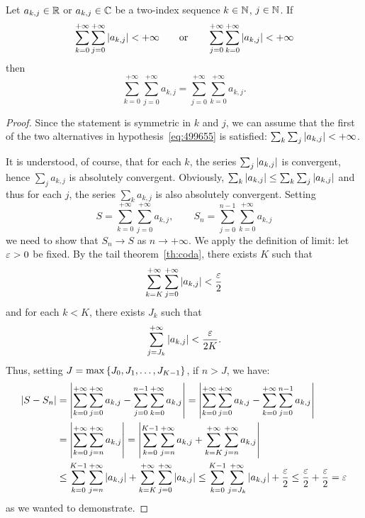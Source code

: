 \begin{theorem}
\label{th:scambio_somma}
Let $a_{k,j}\in {\mathbb R}$ or $a_{k,j}\in {\mathbb C}$ be a two-index sequence $k\in {\mathbb N}$,
$j\in {\mathbb N}$. If
\begin{equation}\label{eq:499655}
  \sum_{k=0}^{+\infty}\sum_{j=0}^{+\infty}{\left|a_{k,j}\right|}<+\infty  
  \qquad \text{or} \qquad
  \sum_{j=0}^{+\infty}\sum_{k=0}^{+\infty}{\left|a_{k,j}\right|}<+\infty  
\end{equation}
then
\begin{equation}\label{eq:scambio_somma}
  \sum_{k=0}^{+\infty} \sum_{j=0}^{+\infty} a_{k,j}
  = \sum_{j=0}^{+\infty} \sum_{k=0}^{+\infty} a_{k,j}.
\end{equation}
\end{theorem}
%
\begin{proof}
Since the statement is symmetric in $k$ and $j$, we can assume that the first of
the two alternatives in hypothesis~\eqref{eq:499655} is satisfied: $\sum_k
\sum_j {\left|a_{k,j}\right|}<+\infty$.

It is understood, of course, that for each $k$, the series $\sum_j
{\left|a_{k,j}\right|}$ is convergent, hence $\sum_j a_{k,j}$ is absolutely convergent.
Obviously, 
$\sum_k {\left|a_{k,j}\right|} \le \sum_k \sum_j {\left|a_{k,j}\right|}$
and thus for each $j$, the series 
$\sum_k a_{k,j}$ is also absolutely convergent.
Setting
\[
S = \sum_{k=0}^{+\infty}\sum_{j=0}^{+\infty} a_{k,j},
\qquad
S_n = \sum_{j=0}^{n-1}\sum_{k=0}^{+\infty} a_{k,j}  
\]
we need to show that $S_n \to S$
as $n\to +\infty$. 
We apply the definition of limit:
let $\varepsilon>0$ be fixed.
By the tail theorem~\ref{th:coda}, there exists $K$ such that 
\[
  \sum_{k=K}^{+\infty} \sum_{j=0}^{+\infty} {\left|a_{k,j}\right|}<\frac {\varepsilon} 2
\]
and for each $k<K$, there exists $J_k$ such that 
\[
  \sum_{j=J_k}^{+\infty} {\left|a_{k,j}\right|} < \frac{\varepsilon}{2K}.  
\]
Thus, setting $J=\max{\left\{ J_0,J_1, \dots, J_{K-1} \right\}}$, if $n>J$, we have:
\begin{align*}
  {\left|S-S_n\right|}
  &= {\left|\sum_{k=0}^{+\infty}\sum_{j=0}^{+\infty}a_{k,j} 
  - \sum_{j=0}^{n-1}\sum_{k=0}^{+\infty}a_{k,j}\right|}
  = 
  {\left|\sum_{k=0}^{+\infty}\sum_{j=0}^{+\infty}a_{k,j} 
  - \sum_{k=0}^{+\infty}\sum_{j=0}^{n-1}a_{k,j}\right|}\\
  &=
  {\left|\sum_{k=0}^{+\infty}\sum_{j=n}^{+\infty}a_{k,j} \right|}
  = {\left|\sum_{k=0}^{K-1}\sum_{j=n}^{+\infty} a_{k,j}
   + \sum_{k=K}^{+\infty}\sum_{j=n}^{+\infty} a_{k,j}\right|}\\
   &\le \sum_{k=0}^{K-1}\sum_{j=n}^{+\infty} {\left|a_{k,j}\right|}
    + \sum_{k=K}^{+\infty}\sum_{j=0}^{+\infty} {\left|a_{k,j}\right|}
   \le \sum_{k=0}^{K-1}\sum_{j=J_k}^{+\infty} {\left|a_{k,j}\right|}
   + \frac {\varepsilon} 2
  \le \frac {\varepsilon} 2 + \frac {\varepsilon} 2 = \varepsilon
\end{align*}
as we wanted to demonstrate.
\end{proof}

